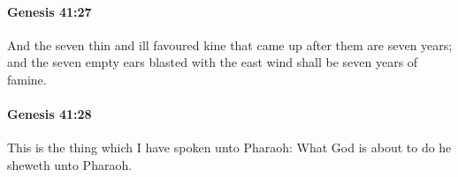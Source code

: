 		\paragraph{Genesis 41:27} %
			\label{GENESIS-41-27}

			And the seven thin and ill favoured kine that came up after them are seven years; and the seven empty ears blasted with the east wind shall be seven years of famine.


		\paragraph{Genesis 41:28} %
			\label{GENESIS-41-28}

			This is the thing which I have spoken unto Pharaoh: What God is about to do he sheweth unto Pharaoh.


